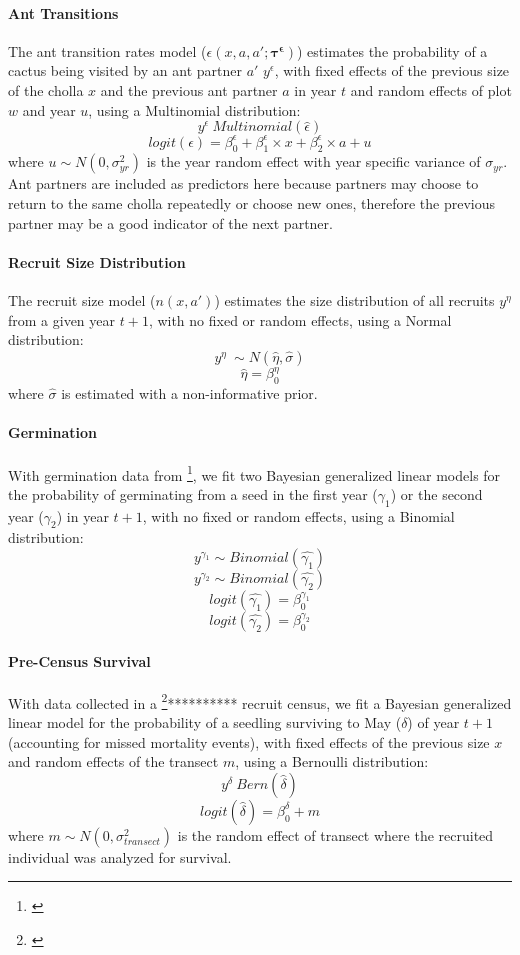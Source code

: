 \documentclass[11pt]{article}
\newcommand{\tom}[2]{{\color{red}{#1}}\footnote{\textit{\color{red}{#2}}}}
\begin{document}
\paragraph{Ant Transitions}
The ant transition rates model ($\epsilon(x,a,a';\pmb{\tau^{\epsilon}})$) estimates the probability of a cactus being visited by an ant partner $a'$ $y^{\epsilon}$, with fixed effects of the previous size of the cholla $x$  and the previous ant partner $a$  in year $t$ and random effects of plot $w$ and year $u$, using a Multinomial distribution: 
$$y^{\epsilon} ~ Multinomial(\hat{\epsilon})$$
$$logit(\epsilon) = \beta_{0}^{\epsilon} + \beta_{1}^{\epsilon} \times x + \beta_{2}^{\epsilon} \times a + u$$
where $u \sim N(0,\sigma_{yr}^{2})$ is the year random effect with year specific variance of $\sigma_{yr}$.
Ant partners are included as predictors here because partners may choose to return to the same cholla repeatedly or choose new ones, therefore the previous partner may be a good indicator of the next partner. 

\paragraph{Recruit Size Distribution}
The recruit size model ($n(x,a')$) estimates the size distribution of all recruits $y^{\eta}$ from a given year $t+1$, with no fixed or random effects, using a Normal distribution: 
$$y^{\eta} ~\sim N(\hat{\eta},\hat{\sigma})$$
$$\hat{\eta} = \beta_{0}^{\eta}$$
where $\hat{\sigma}$ is estimated with a non-informative prior. 

\paragraph{Germination}
With germination data from \tom{Miller et al., 2007}{CITE}, we fit two Bayesian generalized linear models for the probability of germinating from a seed in the first year ($\gamma_1$) or the second year ($\gamma_2$) in year $t+1$, with no fixed or random effects, using a Binomial distribution:
$$y^{\gamma_1} \sim Binomial(\hat{\gamma_1})$$
$$y^{\gamma_2} \sim Binomial(\hat{\gamma_2})$$
$$logit(\hat{\gamma_1}) = \beta_{0}^{\gamma_1}$$
$$logit(\hat{\gamma_2}) = \beta_{0}^{\gamma_2}$$

\paragraph{Pre-Census Survival}
With data collected in a \tom{2005-2006}{FIX}********** recruit census, we fit a Bayesian generalized linear model for the probability of a seedling surviving to May ($\delta$) of year $t+1$ (accounting for missed mortality events), with fixed effects of the previous size $x$ and random effects of the transect $m$, using a Bernoulli distribution: 
$$y^{\delta} ~ Bern(\hat{\delta})$$
$$logit(\hat{\delta}) = \beta_{0}^{\delta} + m$$
 where $m \sim N(0, \sigma_{transect}^2)$ is the random effect of transect where the recruited individual was analyzed for survival.
\end{document}
